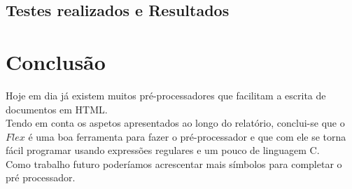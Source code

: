 \documentclass{report}
\begin{document}
\section{Testes realizados e Resultados}





\chapter{Conclusão} \label{concl}

Hoje em dia já existem muitos pré-processadores que facilitam a escrita de documentos em HTML.\\
Tendo em conta os aspetos apresentados ao longo do relatório, conclui-se que o $Flex$ é uma boa ferramenta para fazer o pré-processador e que com ele se torna fácil programar usando expressões regulares e um pouco de linguagem C. \\
Como trabalho futuro poderíamos acrescentar mais símbolos para completar o pré processador.
\end{document}
